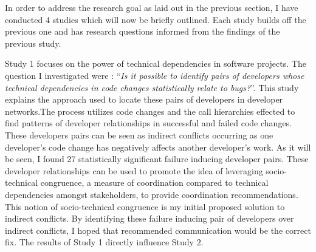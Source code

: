 In order to address the research goal as laid out in the previous section, I have conducted 4 studies which will
now be briefly outlined. Each study builds off the previous one and has research questions informed from the
findings of the previous study.

Study 1 focuses on the power of technical dependencies in software projects. The question I
investigated were : ``\textit{Is it possible to identify pairs of developers whose technical dependencies in 
code changes statistically relate to bugs?}''. This study explains the approach used to locate these pairs of developers 
in developer networks.The process utilizes code changes and the call hierarchies effected to find patterns of developer 
relationships in successful and failed code changes. These developers pairs can be seen as indirect conflicts occurring
as one developer's code change has negatively affects another developer's work. As it will be seen, I found 27 statistically significant failure 
inducing developer pairs. These developer relationships can be used to promote the idea of leveraging socio-technical 
congruence, a measure of coordination compared to technical dependencies amongst stakeholders, to provide coordination recommendations.
This notion of socio-technical congruence is my initial proposed solution to indirect conflicts. By identifying these failure
inducing pair of developers over indirect conflicts, I hoped that recommended communication would be the correct fix. The 
results of Study 1 directly influence Study 2.

